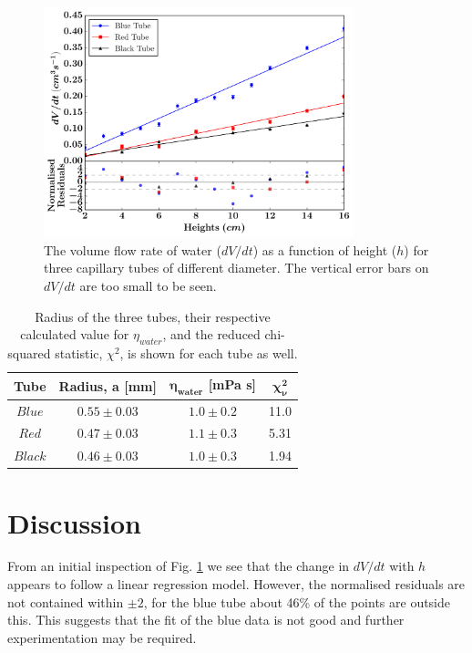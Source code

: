 \documentclass[twocolumn]{revtex4}
\newcommand{\squeezeup}{\vspace{-2.5mm}}
\begin{document}
\vspace{-1ex}
\begin{figure}[!h]
\begin{center}
\includegraphics[width=9cm]{fig1-3}
\caption[]{The volume flow rate of water ($dV/dt$) as a function of height ($h$) for three capillary tubes of different diameter. The vertical error bars on $dV/dt$ are too small to be seen.}
\label{fig:fig2}
\end{center}
\end{figure}

\squeezeup
\squeezeup
\squeezeup

\begin{table}[h!]
\centering
\begin{tabular}{ |c|c|c|c| } 
 \hline
 \textbf{Tube} & \textbf{Radius, a [mm]} & \textbf{$\boldsymbol{\eta_{water}}$ [mPa {s}]} & \textbf{$\boldsymbol{\chi^2_{\nu}}$} \\ [0.5ex] 
 \hline
 $Blue$ &$0.55\pm0.03$ & $1.0\pm0.2$ & 11.0 \\ 
 $Red$ & $0.47\pm0.03$ & $1.1\pm0.3$ & 5.31 \\
 $Black$ & $0.46\pm0.03$ & $1.0\pm0.3$ & 1.94 \\
 
 \hline
\end{tabular}
\caption{Radius of the three tubes, their respective calculated value for $\eta_{water}$, and the reduced chi-squared statistic, $\chi^2$, is shown for each tube as well.}
\label{table:1}
\end{table}

\squeezeup
\squeezeup

\vspace{-3ex}
\section{Discussion}
\vspace{-2ex}
From an initial inspection of Fig. \ref{fig:fig2} we see that the change in $dV/dt$ with $h$ appears to follow a linear regression model. However, the normalised residuals are not contained within $\pm 2$, for the blue tube about 46\% of the points are outside this. This suggests that the fit of the blue data is not good and further experimentation may be required. 
\end{document}
